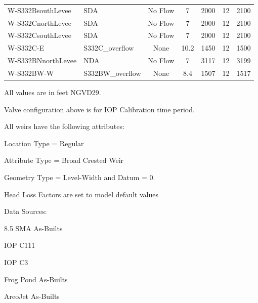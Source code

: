 \begin{table}[!h]
\begin{tabular}{llccccc}
W-S332BsouthLevee & SDA              & No Flow   &  7      & 2000    & 12    & 2100  \\
W-S332CnorthLevee & SDA              & No Flow   &  7      & 2000    & 12    & 2100  \\
W-S332CsouthLevee & SDA              & No Flow   &  7      & 2000    & 12    & 2100  \\
W-S332C-E         & S332C\_overflow  & None      &  10.2   & 1450    & 12    & 1500  \\
W-S332BNnorthLevee& NDA              & No Flow   &  7      & 3117    & 12    & 3199  \\
W-S332BW-W        & S332BW\_overflow & None      &  8.4    & 1507    & 12    & 1517  \\
\hline
\end{tabular}

All values are in feet NGVD29.

Valve configuration above is for IOP Calibration time period. 
 
All weirs have the following attributes:
\begin{packed_items}
\item Location Type = Regular
\item Attribute Type = Broad Crested Weir
\item Geometry Type = Level-Width and Datum = 0.
\item Head Loss Factors are set to model default values
\end{packed_items}

Data Sources:
\begin{packed_items}
\item 8.5 SMA As-Builts
\item IOP C111
\item IOP C3
\item Frog Pond As-Builts
\item AreoJet As-Builts
\end{packed_items}

\end{table}

\clearpage

